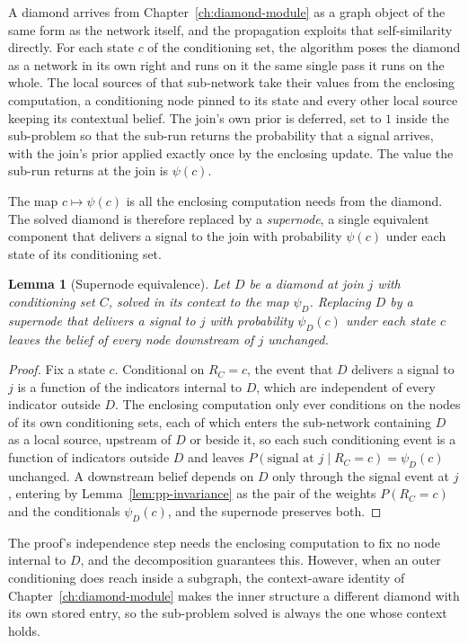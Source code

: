 \documentclass[12pt]{report}
\newtheorem{lemma}[theorem]{Lemma}
\begin{document}
A diamond arrives from Chapter~\ref{ch:diamond-module} as a graph object of the same form as the network itself, and the propagation exploits that self-similarity directly. For each state $c$ of the conditioning set, the algorithm poses the diamond as a network in its own right and runs on it the same single pass it runs on the whole. The local sources of that sub-network take their values from the enclosing computation, a conditioning node pinned to its state and every other local source keeping its contextual belief. The join's own prior is deferred, set to $1$ inside the sub-problem so that the sub-run returns the probability that a signal arrives, with the join's prior applied exactly once by the enclosing update. The value the sub-run returns at the join is $\psi(c)$.

The map $c \mapsto \psi(c)$ is all the enclosing computation needs from the diamond. The solved diamond is therefore replaced by a \emph{supernode}, a single equivalent component that delivers a signal to the join with probability $\psi(c)$ under each state of its conditioning set.

\begin{lemma}[Supernode equivalence]
\label{lem:pp-supernode}
Let $D$ be a diamond at join $j$ with conditioning set $C$, solved in its context to the map $\psi_D$. Replacing $D$ by a supernode that delivers a signal to $j$ with probability $\psi_D(c)$ under each state $c$ leaves the belief of every node downstream of $j$ unchanged.
\end{lemma}

\begin{proof}
Fix a state $c$. Conditional on $R_C = c$, the event that $D$ delivers a signal to $j$ is a function of the indicators internal to $D$, which are independent of every indicator outside $D$. The enclosing computation only ever conditions on the nodes of its own conditioning sets, each of which enters the sub-network containing $D$ as a local source, upstream of $D$ or beside it, so each such conditioning event is a function of indicators outside $D$ and leaves $P(\text{signal at } j \mid R_C = c) = \psi_D(c)$ unchanged. A downstream belief depends on $D$ only through the signal event at $j$, entering by Lemma~\ref{lem:pp-invariance} as the pair of the weights $P(R_C = c)$ and the conditionals $\psi_D(c)$, and the supernode preserves both.
\end{proof}

The proof's independence step needs the enclosing computation to fix no node internal to $D$, and the decomposition guarantees this. However, when an outer conditioning does reach inside a subgraph, the context-aware identity of Chapter~\ref{ch:diamond-module} makes the inner structure a different diamond with its own stored entry, so the sub-problem solved is always the one whose context holds.
\end{document}
